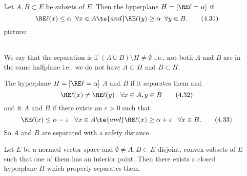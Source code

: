 \begin{definition}\label{iv.13}
    Let $A,B\subset E$ be subsets of $E$. Then the hyperplane $H=[\RE\ell=\alpha]$  if
    \[\RE\ell(x)\leq\alpha\;\;\forall x\in A\te{ and }\RE\ell(y)\geq\alpha\;\;\forall y\in B.\tag{4.31}\label{4.31}\]
    picture:
    \begin{figure}[!h]
        \centering
    \end{figure}\\
    
    We say that the separation is  if $(A\cup B)\setminus H\neq\emptyset$ \rec{(}i.e., not both $A$ and $B$ are in the same halfplane \rec{(}i.e., we do not have $A\subset H$ and $B\subset H$\rec{)}\rec{)}.
    
    The hyperplane $H=[\RE\ell=\alpha]$  $A$ and $B$ if it separates them and
    \[\RE\ell(x)\neq\RE\ell(y)\;\;\;\forall x\in A,y\in B\tag{4.32}\label{4.32}\]
    and it  $A$ and $B$ if there exists an $\varepsilon>0$ such that
    \[\RE\ell(x)\leq\alpha-\varepsilon\;\;\;\forall x\in A\te{ and }\RE\ell(x)\geq\alpha+\varepsilon\;\;\;\forall x\in B.\tag{4.33}\label{4.33}\]
    So $A$ and $B$ are separated with a safety distance.
\end{definition}

\begin{thm}\label{iv.14}
    Let $E$ be a normed vector space and $\emptyset\neq A,B\subset E$ disjoint, convex subsets of $E$ such that one of them has an interior point. Then there exists a closed hyperplane $H$ which properly separates them.
\end{thm}


